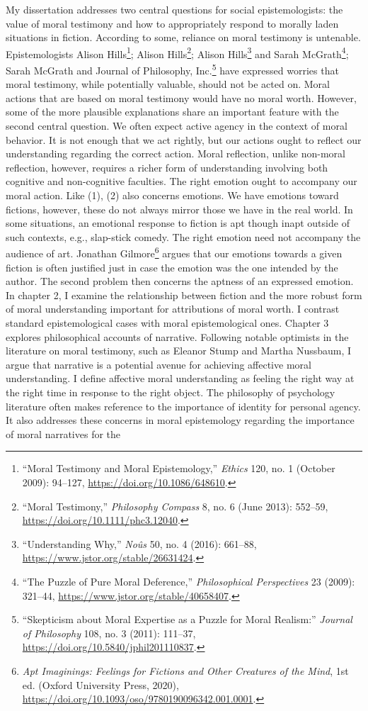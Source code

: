 \documentclass[phdthesis,12pt,final,a4paper]{wuthesis}
\theoremstyle{definition}
\theoremstyle{definition}
\theoremstyle{definition}
\theoremstyle{definition}
\theoremstyle{remark}
\begin{document}
My dissertation addresses two central questions for social epistemologists: the value of moral testimony and how to appropriately respond to morally laden situations in fiction. According to some, reliance on moral testimony is untenable. Epistemologists Alison Hills\footnote{{``Moral Testimony and Moral Epistemology,''} \emph{Ethics} 120, no. 1 (October 2009): 94--127, \url{https://doi.org/10.1086/648610}.}; Alison Hills\footnote{{``Moral {Testimony},''} \emph{Philosophy Compass} 8, no. 6 (June 2013): 552--59, \url{https://doi.org/10.1111/phc3.12040}.}; Alison Hills\footnote{{``Understanding {Why},''} \emph{Noûs} 50, no. 4 (2016): 661--88, \url{https://www.jstor.org/stable/26631424}.} and Sarah McGrath\footnote{{``The {Puzzle} of {Pure Moral Deference},''} \emph{Philosophical Perspectives} 23 (2009): 321--44, \url{https://www.jstor.org/stable/40658407}.}; Sarah McGrath and Journal of Philosophy, Inc.\footnote{{``Skepticism about {Moral Expertise} as a {Puzzle} for {Moral Realism}:''} \emph{Journal of Philosophy} 108, no. 3 (2011): 111--37, \url{https://doi.org/10.5840/jphil201110837}.} have expressed worries that moral testimony, while potentially valuable, should not be acted on. Moral actions that are based on moral testimony would have no moral worth. However, some of the more plausible explanations share an important feature with the second central question. We often expect active agency in the context of moral behavior. It is not enough that we act rightly, but our actions ought to reflect our understanding regarding the correct action. Moral reflection, unlike non-moral reflection, however, requires a richer form of understanding involving both cognitive and non-cognitive faculties. The right emotion ought to accompany our moral action. Like (1), (2) also concerns emotions. We have emotions toward fictions, however, these do not always mirror those we have in the real world. In some situations, an emotional response to fiction is apt though inapt outside of such contexts, e.g., slap-stick comedy. The right emotion need not accompany the audience of art. Jonathan Gilmore\footnote{\emph{Apt {Imaginings}: {Feelings} for {Fictions} and {Other Creatures} of the {Mind}}, 1st ed. (Oxford University Press, 2020), \url{https://doi.org/10.1093/oso/9780190096342.001.0001}.} argues that our emotions towards a given fiction is often justified just in case the emotion was the one intended by the author. The second problem then concerns the aptness of an expressed emotion. In chapter 2, I examine the relationship between fiction and the more robust form of moral understanding important for attributions of moral worth. I contrast standard epistemological cases with moral epistemological ones. Chapter 3 explores philosophical accounts of narrative. Following notable optimists in the literature on moral testimony, such as Eleanor Stump and Martha Nussbaum, I argue that narrative is a potential avenue for achieving affective moral understanding. I define affective moral understanding as feeling the right way at the right time in response to the right object. The philosophy of psychology literature often makes reference to the importance of identity for personal agency. It also addresses these concerns in moral epistemology regarding the importance of moral narratives for the 
\end{document}
